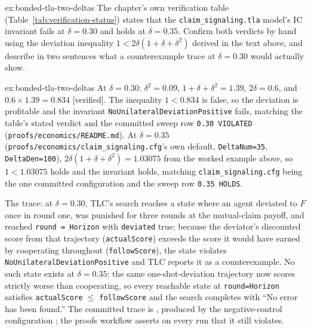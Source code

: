 \documentclass[11pt,a4paper]{article}
\theoremstyle{definition}
\theoremstyle{remark}
\begin{document}
\begin{pdexercise}[kind=Trace,rating=2]{ex:bonded-tla-two-deltas}
The chapter's own verification table (Table~\ref{tab:verification-status}) states that the \texttt{claim\_signaling.tla} model's IC invariant fails at $\delta=0.30$ and holds at $\delta=0.35$. Confirm both verdicts by hand using the deviation inequality $1 < 2\delta(1+\delta+\delta^2)$ derived in the text above, and describe in two sentences what a counterexample trace at $\delta=0.30$ would actually show.
\end{pdexercise}
\begin{pdsolution}{ex:bonded-tla-two-deltas}
At $\delta=0.30$: $\delta^2=0.09$, $1+\delta+\delta^2=1.39$, $2\delta=0.6$, and $0.6\times1.39=0.834$ [verified]. The inequality $1<0.834$ is false, so the deviation is profitable and the invariant \texttt{NoUnilateralDeviationPositive} fails, matching the table's stated verdict and the committed sweep row \texttt{0.30 VIOLATED} (\texttt{proofs/economics/README.md}). At $\delta=0.35$ (\texttt{proofs/economics/claim\_signaling.cfg}'s own default, \texttt{DeltaNum=35}, \texttt{DeltaDen=100}), $2\delta(1+\delta+\delta^2)=1.03075$ from the worked example above, so $1<1.03075$ holds and the invariant holds, matching \texttt{claim\_signaling.cfg} being the one committed configuration and the sweep row \texttt{0.35 HOLDS}.

The trace: at $\delta=0.30$, TLC's search reaches a state where an agent deviated to $F$ once in round one, was punished for three rounds at the mutual-claim payoff, and reached \texttt{round = Horizon} with \texttt{deviated} true; because the deviator's discounted score from that trajectory (\texttt{actualScore}) exceeds the score it would have earned by cooperating throughout (\texttt{followScore}), the state violates \texttt{No}\allowbreak\texttt{Unilateral}\allowbreak\texttt{Deviation}\allowbreak\texttt{Positive} and TLC reports it as a counterexample. No such state exists at $\delta=0.35$: the same one-shot-deviation trajectory now scores strictly worse than cooperating, so every reachable state at \texttt{round=Horizon} satisfies \texttt{actualScore} $\le$ \texttt{followScore} and the search completes with ``No error has been found.'' The committed trace is , produced by the negative-control configuration ; the proofs workflow asserts on every run that it still violates.
\end{pdsolution}
\end{document}
